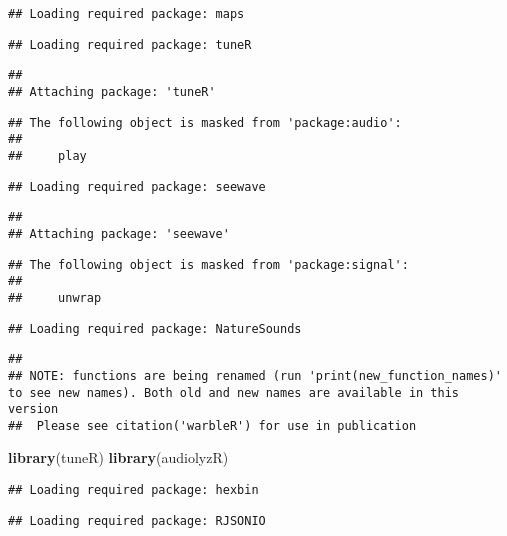 \documentclass[]{article}
\newenvironment{Shaded}{\begin{snugshade}}{\end{snugshade}}
\newcommand{\KeywordTok}[1]{\textcolor[rgb]{0.13,0.29,0.53}{\textbf{#1}}}
\newcommand{\NormalTok}[1]{#1}
\begin{document}
\begin{verbatim}
## Loading required package: maps
\end{verbatim}

\begin{verbatim}
## Loading required package: tuneR
\end{verbatim}

\begin{verbatim}
## 
## Attaching package: 'tuneR'
\end{verbatim}

\begin{verbatim}
## The following object is masked from 'package:audio':
## 
##     play
\end{verbatim}

\begin{verbatim}
## Loading required package: seewave
\end{verbatim}

\begin{verbatim}
## 
## Attaching package: 'seewave'
\end{verbatim}

\begin{verbatim}
## The following object is masked from 'package:signal':
## 
##     unwrap
\end{verbatim}

\begin{verbatim}
## Loading required package: NatureSounds
\end{verbatim}

\begin{verbatim}
## 
## NOTE: functions are being renamed (run 'print(new_function_names)' to see new names). Both old and new names are available in this version 
##  Please see citation('warbleR') for use in publication
\end{verbatim}

\begin{Shaded}
\begin{Highlighting}[]
\KeywordTok{library}\NormalTok{(tuneR)}
\KeywordTok{library}\NormalTok{(audiolyzR)}
\end{Highlighting}
\end{Shaded}

\begin{verbatim}
## Loading required package: hexbin
\end{verbatim}

\begin{verbatim}
## Loading required package: RJSONIO
\end{verbatim}
\end{document}
